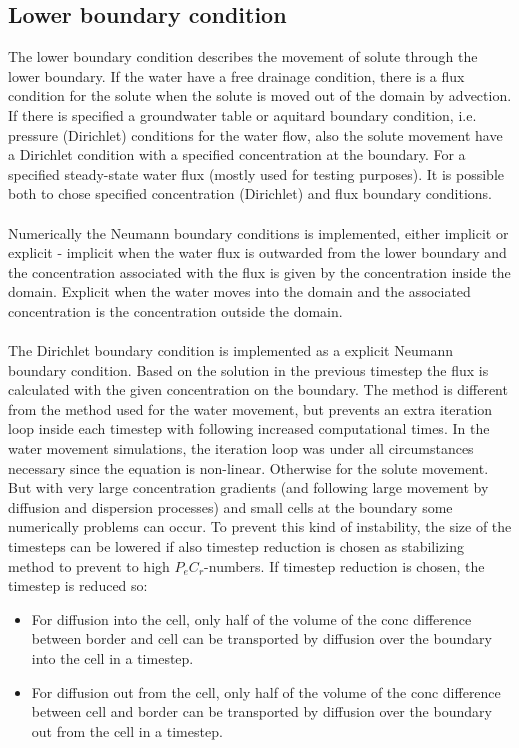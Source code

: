 \documentclass{report}
\begin{document}
\subsection{Lower boundary condition}

The lower boundary condition describes the movement of solute
through the lower boundary. If the water have a free drainage
condition, there is a flux condition for the solute when the solute is
moved out of the domain by advection. If there is specified a
groundwater table or aquitard boundary condition, i.e. pressure
(Dirichlet) conditions for the water flow, also the solute movement
have a Dirichlet condition with a specified concentration at the
boundary. For a specified steady-state water flux (mostly used for
testing purposes). It is possible both to chose specified
concentration (Dirichlet) and flux boundary conditions. \\
\\
Numerically the Neumann boundary conditions is implemented,
either implicit or explicit - implicit when the water flux is outwarded
from the lower boundary and the concentration associated with the
flux is given by the concentration inside the domain. Explicit when
the water moves into the domain and the associated concentration
is the concentration outside the domain. \\
\\
The Dirichlet boundary condition is implemented as a explicit
Neumann boundary condition. Based on the solution in the previous
timestep the flux is calculated with the given concentration on the
boundary. The method is different from the method used for the
water movement, but prevents an extra iteration loop inside each
timestep with following increased computational times. In the water
movement simulations, the iteration loop was under all
circumstances necessary since the equation is non-linear. Otherwise
for the solute movement. But with very large concentration
gradients (and following large movement by diffusion and dispersion
processes) and small cells at the boundary some numerically
problems can occur. To prevent this kind of instability, the size of
the timesteps can be lowered if also timestep reduction is chosen as
stabilizing method to prevent to high $P_eC_r$-numbers. If
timestep reduction is chosen, the timestep is reduced so:

\begin{itemize}
\item  For diffusion into the cell, only half of the volume of the
    conc difference between border and cell can be transported by
    diffusion over the boundary into the cell in a timestep.
\item For diffusion out from the cell, only half of the volume of
    the conc difference between cell and border can be
    transported by diffusion over the boundary out from the cell in
    a timestep.
 \end{itemize}
\end{document}
